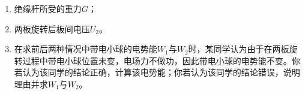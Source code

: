 \begin{enumerate}[leftmargin=0em]
\begin{enumerate}
\item 
绝缘杆所受的重力$ G $；

\item 
两板旋转后板间电压$ U_{2} $。

\item 
在求前后两种情况中带电小球的电势能$ W_1 $与$ W_2 $时，某同学认为由于在两板旋转过程中带电小球位置未变，电场力不做功，因此带电小球的电势能不变。你若认为该同学的结论正确，计算该电势能；你若认为该同学的结论错误，说明理由并求$ W_1 $与$ W_2 $。
\end{enumerate}
\begin{figure}[h!]
\flushright

\end{figure}





\end{enumerate}






